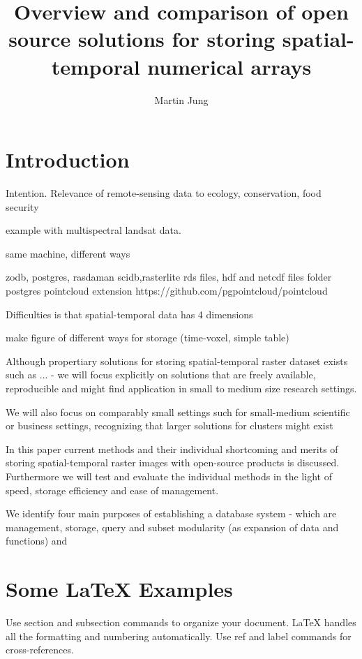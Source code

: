 \documentclass[fleqn,10pt]{wlpeerj}
\title{Overview and comparison of open source solutions for storing spatial-temporal numerical arrays}
\author[1]{Martin Jung}
\affil[1]{Current address:  School of Life Sciences, University of Sussex, Brighton BN1 9QG, UK.  }
\begin{document}
\flushbottom
\maketitle
\thispagestyle{empty}

\section*{Introduction}

Intention. Relevance of remote-sensing data to ecology, conservation, food security

example with multispectral landsat data.

same machine, different ways

zodb, postgres, rasdaman
scidb,rasterlite
rds files, hdf and netcdf files
folder
postgres pointcloud extension
https://github.com/pgpointcloud/pointcloud


Difficulties is that spatial-temporal data has 4 dimensions

make figure of different ways for storage (time-voxel, simple table)

Although propertiary solutions for storing spatial-temporal raster dataset exists such as ... - we will focus explicitly on solutions that are freely available, reproducible and might find application in small to medium size research settings.

We will also focus on comparably small settings such for small-medium scientific or business settings, recognizing that larger solutions for clusters  might exist \citep{Winslett}

In this paper current methods and their individual shortcoming and merits of storing spatial-temporal raster images with open-source products is discussed. 
Furthermore we will test and evaluate the individual methods in the light of speed, storage efficiency and ease of management.

We identify four main purposes of establishing a database system - which are management, storage, query and subset
modularity (as expansion of data and functions) and 


\section*{Some \LaTeX{} Examples}
\label{sec:examples}

Use section and subsection commands to organize your document. \LaTeX{} handles all the formatting and numbering automatically. Use ref and label commands for cross-references.
\end{document}
